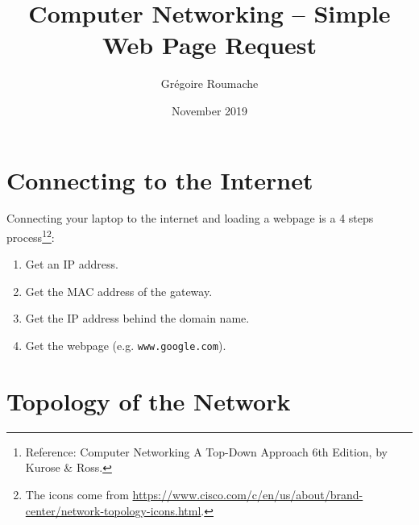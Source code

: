 \documentclass[a4paper]{article}
\title{Computer Networking -- Simple Web Page Request}
\author{Grégoire Roumache}
\date{November 2019}
\begin{document}
\maketitle















\section{Connecting to the Internet}





Connecting your laptop to the internet and loading a webpage is a 4 steps process\footnote{Reference: Computer Networking A Top-Down Approach 6th Edition, by Kurose \& Ross.}\footnote{The icons come from \url{https://www.cisco.com/c/en/us/about/brand-center/network-topology-icons.html}.}:
\begin{enumerate}
    \item Get an IP address.
    \item Get the MAC address of the gateway.
    \item Get the IP address behind the domain name.
    \item Get the webpage (e.g. \texttt{www.google.com}).
\end{enumerate}















\section{Topology of the Network}





\begin{center}

\end{center}
\end{document}

